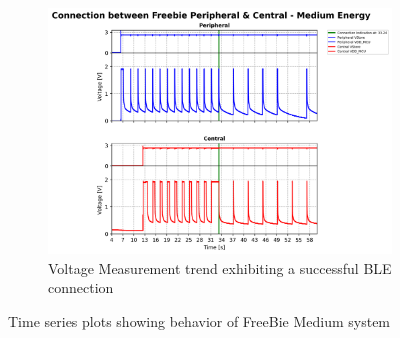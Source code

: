 \begin{figure}[H]
\begin{center}
\begin{subfigure}{0.5\linewidth}
            \includegraphics[width=\linewidth]{chapters/Results/Connection_Freebie_medium.png}
            \caption{Voltage Measurement trend exhibiting a successful BLE connection}
            \label{fig:freebie_medium_conn}
        \end{subfigure}    
    \end{center}
    \caption{\centering Time series plots showing behavior of FreeBie Medium system}
\end{figure}
